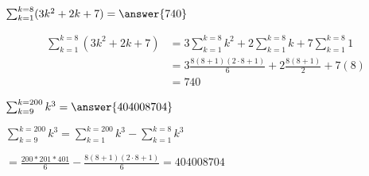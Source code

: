 \documentclass{ximera}
\begin{document}
\begin{question}
	$\sum_{k=1}^{k=8} (3k^2+2k+7) = \answer{740}$
	\begin{hint}
		\begin{align*}
			\sum_{k=1}^{k=8} (3k^2+2k+7) &= 3 \sum_{k=1}^{k=8} k^2 + 2 \sum_{k=1}^{k=8} k + 7   \sum_{k=1}^{k=8} 1\\
			&= 3 \frac{8(8+1)(2\cdot 8+1)}{6} + 2 \frac{8(8+1)}{2} + 7(8)\\
			&= 740
		\end{align*}
	\end{hint}
\end{question}

\begin{question}
	$\sum_{k=9}^{k=200} k^3 = \answer{404008704}$
	
	\begin{hint}
		 $\sum_{k=9}^{k=200} k^3 =  \sum_{k=1}^{k=200} k^3 -  \sum_{k=1}^{k=8} k^3  $
	\end{hint}
	\begin{hint}
		$= \frac{200*201*401}{6}-\frac{8(8+1)(2\cdot 8+1)}{6} = 404008704$
	\end{hint}
\end{question}
\end{document}
